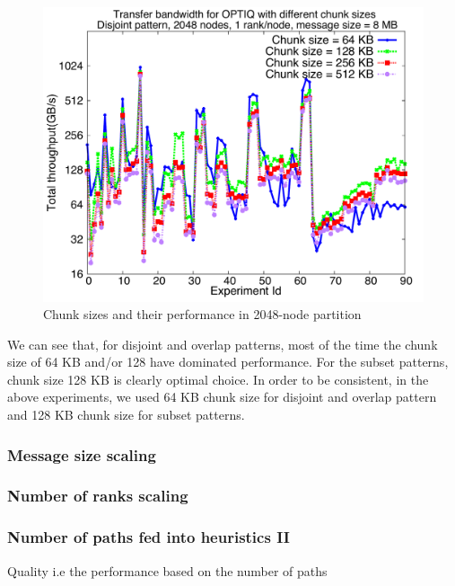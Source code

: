 \begin{figure}[!htb]
\vspace{-0.1in}
\centering
\includegraphics[scale=0.30]{figures/chunksize_2k.pdf}
\vspace{-0.1in}
\caption{Chunk sizes and their performance in 2048-node partition}
\vspace{-0.1in}
\label{fig:chunksize}
\end{figure}

We can see that, for disjoint and overlap patterns, most of the time the chunk size of 64 KB and/or 128 have dominated performance. For the subset patterns, chunk size 128 KB is clearly optimal choice. In order to be consistent, in the above experiments, we used 64 KB chunk size for disjoint and overlap pattern and 128 KB chunk size for subset patterns.

\subsubsection{Message size scaling}

\subsubsection{Number of ranks scaling}

\subsubsection{Number of paths fed into heuristics II}

Quality i.e the performance based on the number of paths


